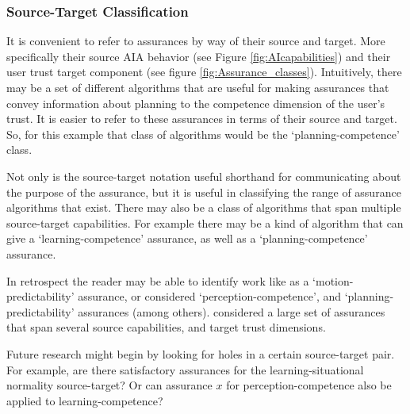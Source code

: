 \subsubsection{Source-Target Classification}
It is convenient to refer to assurances by way of their source and target. More specifically their source AIA behavior (see Figure \ref{fig:AIcapabilities}) and their user trust target component (see figure \ref{fig:Assurance_classes}). Intuitively, there may be a set of different algorithms that are useful for making assurances that convey information about planning to the competence dimension of the user's trust. It is easier to refer to these assurances in terms of their source and target. So, for this example that class of algorithms would be the `planning-competence' class.

Not only is the source-target notation useful shorthand for communicating about the purpose of the assurance, but it is useful in classifying the range of assurance algorithms that exist. There may also be a class of algorithms that span multiple source-target capabilities. For example there may be a kind of algorithm that can give a `learning-competence' assurance, as well as a `planning-competence' assurance.

In retrospect the reader may be able to identify work like \citet{Dragan2013-wd} as a `motion-predictability' assurance, or \cite{Wang2016-id} considered `perception-competence', and `planning-predictability' assurances (among others). \citet{Aitken2016-fb} considered a large set of assurances that span several source capabilities, and target trust dimensions.

Future research might begin by looking for holes in a certain source-target pair. For example, are there satisfactory assurances for the learning-situational normality source-target? Or can assurance $x$ for perception-competence also be applied to learning-competence?
